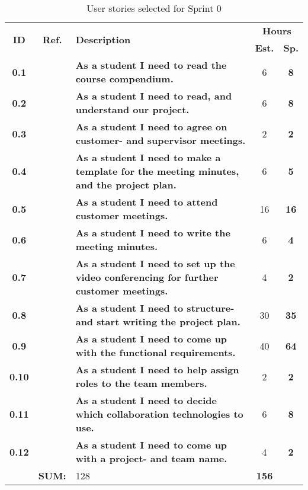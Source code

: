 \begin{table*}[!ht]
\caption{User stories selected for Sprint 0}
\label{tab:sprint0stories}
\def\arraystretch{1.25}
\begin{tabularx}{\textwidth}{ccXcc} 
\toprule[0.5mm]

\multirow{2}{*}{\textbf{ID}} &
\multirow{2}{*}{\textbf{Ref.}} & \multirow{2}{*}{\textbf{Description}} & \multicolumn{2}{c}{\textbf{Hours}} \\
 					& & & \textbf{Est.} & \textbf{Sp.} \\

\midrule
\textbf{0.1} 	&
	& \textbf{As a student I need to read the course compendium.} 										& 		6	& \textbf{8} \\

\textbf{0.2} 	&
	& \textbf{As a student I need to read, and understand our project.} 								& 		6	& \textbf{8} \\	


\textbf{0.3} 	&
	& \textbf{As a student I need to agree on customer- and supervisor meetings.} 						& 		2	& \textbf{2} \\


\textbf{0.4} 	& 
	& {\bf As a student I need to make a template for the meeting minutes, and the project plan.} 		& 		6	& \textbf{5} \\

\textbf{0.5} 	&
	& \textbf{As a student I need to attend customer meetings.} 										&  		16	& \textbf{16} \\

\textbf{0.6} 	&
	& \textbf{As a student I need to write the meeting minutes.} 										&  		6	& \textbf{4} \\

\textbf{0.7} 	&
	& \textbf{As a student I need to set up the video conferencing for further customer meetings.} 		& 		4	& \textbf{2} \\

\textbf{0.8} 	&
	& \textbf{As a student I need to structure- and start writing the project plan.} 					&  		30	& \textbf{35} \\

\textbf{0.9} 	&
	& \textbf{As a student I need to come up with the functional requirements.} 						&  		40	& \textbf{64} \\

\textbf{0.10} 	&
	& \textbf{As a student I need to help assign roles to the team members.} 							& 		2	& \textbf{2} \\

\textbf{0.11} 	&
	& \textbf{As a student I need to decide which collaboration technologies to use.} 					& 		6	& \textbf{8} \\

\textbf{0.12} 	& 
	& \textbf{As a student I need to come up with a project- and team name.} 							& 		4	& \textbf{2} \\
\midrule
				& \textbf{SUM:}		&		128	& \textbf{156}
 \\																			
\bottomrule[0.5mm]
\end{tabularx}
\end{table*}